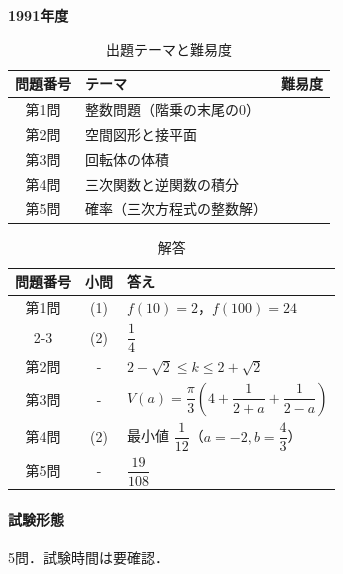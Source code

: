 \documentclass[../../main.tex]{subfiles}
\begin{document}
\begin{center}
  {\fontsize{48pt}{58pt}\selectfont \textbf{1991}\normalsize\textbf{年度}}
\end{center}

\begin{table}[htb]
  \centering
  \caption{出題テーマと難易度}
  \begin{tabular}{|c|p{9cm}|c|}
    \hline
    \textbf{問題番号} & \textbf{テーマ} & \textbf{難易度} \\
    \hline
    第1問 & 整数問題（階乗の末尾の0） & \\
    \hline
    第2問 & 空間図形と接平面 & \\
    \hline
    第3問 & 回転体の体積 & \\
    \hline
    第4問 & 三次関数と逆関数の積分 & \\
    \hline
    第5問 & 確率（三次方程式の整数解） & \\
    \hline
  \end{tabular}
\end{table}

\begin{table}[htb]
  \centering
  \caption{解答}
  \renewcommand{\arraystretch}{1.4}
  \begin{tabular}{|c|c|p{9cm}|}
    \hline
    \textbf{問題番号} & \textbf{小問} & \textbf{答え} \\
    \hline
    第1問 & (1) & $f(10)=2$，$f(100)=24$ \\
    \cline{2-3}
    & (2) & $\dfrac{1}{4}$ \\
    \hline
    第2問 & - & $2-\sqrt{2}\le k\le2+\sqrt{2}$ \\
    \hline
    第3問 & - & $V(a)=\dfrac{\pi}{3}\left(4+\dfrac{1}{2+a}+\dfrac{1}{2-a}\right)$ \\
    \hline
    第4問 & (2) & 最小値 $\dfrac{1}{12}$（$a=-2,b=\dfrac{4}{3}$） \\
    \hline
    第5問 & - & $\dfrac{19}{108}$ \\
    \hline
  \end{tabular}
\end{table}

\paragraph{試験形態}
5問．試験時間は要確認．
\end{document}
